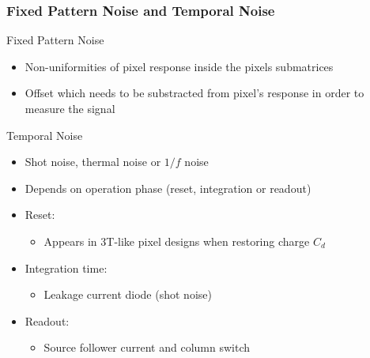 \documentclass{beamer}
\begin{document}
\begin{frame}[plain]
  \frametitle{Fixed Pattern Noise and Temporal Noise}
  
  \begin{block}{Fixed Pattern Noise}
    \begin{itemize}
      \item Non-uniformities of pixel response inside the pixels submatrices 
      \item Offset which needs to be substracted from pixel's response in order to measure the signal
    \end{itemize}
  \end{block}

  \begin{block}{Temporal Noise}
    \begin{itemize}
      \item Shot noise, thermal noise or $1/f$ noise
      \item Depends on operation phase (reset, integration or readout)
      \item Reset:
      \begin{itemize}
        \item Appears in 3T-like pixel designs when restoring charge $C_d$
      \end{itemize}
      \item Integration time:
      \begin{itemize}
        \item Leakage current diode (shot noise)
      \end{itemize}
      \item Readout:
      \begin{itemize}
        \item Source follower current and column switch
      \end{itemize}
    \end{itemize}
  \end{block}
\end{frame}

\end{document}
